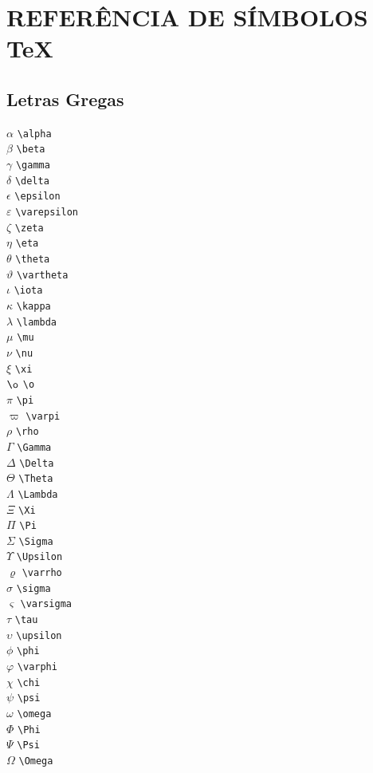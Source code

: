 \documentclass{fei}
\begin{document}
	\chapter{REFERÊNCIA DE SÍMBOLOS \TeX{}}

\section{Letras Gregas}
\begin{multicols}{3}
\noindent
\(\alpha\) \verb+\alpha+\\
\(\beta\) \verb+\beta+\\
\(\gamma\) \verb+\gamma+\\
\(\delta\) \verb+\delta+\\
\(\epsilon\) \verb+\epsilon+\\
\(\varepsilon\) \verb+\varepsilon+\\
\(\zeta\) \verb+\zeta+\\
\(\eta\) \verb+\eta+\\
\(\theta\) \verb+\theta+\\
\(\vartheta\) \verb+\vartheta+\\
\(\iota\) \verb+\iota+\\
\(\kappa\) \verb+\kappa+\\
\(\lambda\) \verb+\lambda+\\
\(\mu\) \verb+\mu+\\
\(\nu\) \verb+\nu+\\
\(\xi\) \verb+\xi+\\
\(\o\) \verb+\o+\\
\(\pi\) \verb+\pi+\\
\(\varpi\) \verb+\varpi+\\
\(\rho\) \verb+\rho+\\
\(\Gamma\) \verb+\Gamma+\\
\(\Delta\) \verb+\Delta+\\
\(\Theta\) \verb+\Theta+\\
\(\Lambda\) \verb+\Lambda+\\
\(\Xi\) \verb+\Xi+\\
\(\Pi\) \verb+\Pi+\\
\(\Sigma\) \verb+\Sigma+\\
\(\Upsilon\) \verb+\Upsilon+\\
\(\varrho\) \verb+\varrho+\\
\(\sigma\) \verb+\sigma+\\
\(\varsigma\) \verb+\varsigma+\\
\(\tau\) \verb+\tau+\\
\(\upsilon\) \verb+\upsilon+\\
\(\phi\) \verb+\phi+\\
\(\varphi\) \verb+\varphi+\\
\(\chi\) \verb+\chi+\\
\(\psi\) \verb+\psi+\\
\(\omega\) \verb+\omega+\\
\(\Phi\) \verb+\Phi+\\
\(\Psi\) \verb+\Psi+\\
\(\Omega\) \verb+\Omega+\\
\end{multicols}
\end{document}
